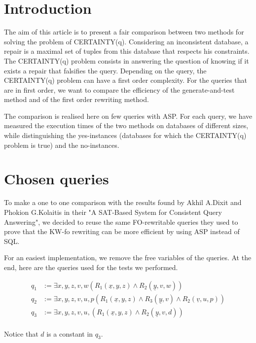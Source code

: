 
\section{Introduction}
The aim of this article is to present a fair comparison between two methods for
solving the problem of CERTAINTY(q). Considering an inconsistent database, a
repair is a maximal set of tuples from this database that respects his
constraints. The CERTAINTY(q) problem consists in answering the question of
knowing if it exists a repair that falsifies the query. Depending on the query,
the CERTAINTY(q) problem can have a first order complexity. For the queries that are in first order, we want to compare the
efficiency of the generate-and-test method and of the first order rewriting
method. 

The comparison is realised here on few queries with ASP. For each query, we have measured the execution times of the two methods on databases of different sizes, while distinguishing the yes-instances (databases for which the CERTAINTY(q) problem is true) and the no-instances.




\section{Chosen queries}

To make a one to one comparison with the results found by Akhil A.Dixit and
Phokion G.Kolaitis in their "A SAT-Based System for Consistent Query
Answering", we decided to reuse the same FO-rewritable queries they used to prove that the KW-fo rewriting can be more efficient by using ASP instead of SQL. 

For an easiest implementation, we remove the free variables of the queries. At the end, here are the queries used for the tests we performed.

\begin{align*}
q_1 &:= \exists x, y, z, v, w (R_1(\underline{x},y,z) \wedge R_2(\underline{y}, v, w))\\
q_2 &:= \exists x, y, z, v, u, p (R_1(\underline{x},y,z) \wedge R_3(\underline{y}, v) \wedge R_2(\underline{v}, u, p)) \\
q_3 &:= \exists x, y, z, v, u, (R_1(\underline{x},y,z) \wedge R_2(\underline{y}, v, d)) \\
\end{align*}

Notice that $d$ is a constant in $q_3$.